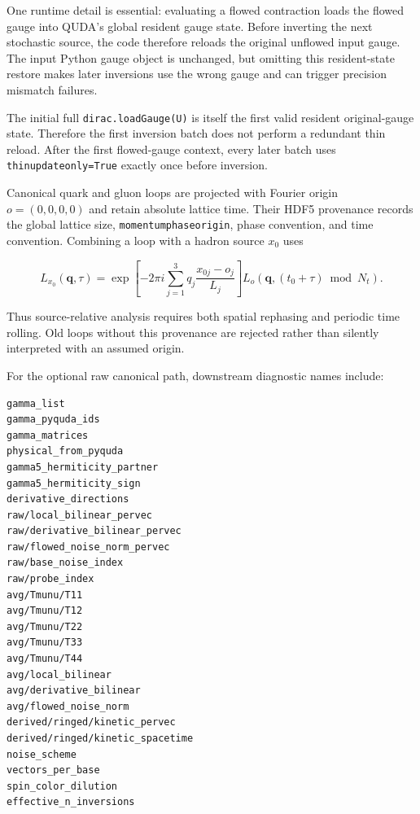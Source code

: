 \documentclass[11pt,a4paper]{article}
\newcommand{\code}[1]{\texttt{\begingroup\def\_{\textunderscore\allowbreak}#1\endgroup}}
\begin{document}
One runtime detail is essential: evaluating a flowed contraction loads the
flowed gauge into QUDA's global resident gauge state.  Before inverting the next
stochastic source, the code therefore reloads the original unflowed input gauge.
The input Python gauge object is unchanged, but omitting this resident-state
restore makes later inversions use the wrong gauge and can trigger precision
mismatch failures.

The initial full \code{dirac.loadGauge(U)} is itself the first valid resident
original-gauge state.  Therefore the first inversion batch does not perform a
redundant thin reload.  After the first flowed-gauge context, every later batch
uses \code{thin\_update\_only=True} exactly once before inversion.

Canonical quark and gluon loops are projected with Fourier origin
$o=(0,0,0,0)$ and retain absolute lattice time.  Their HDF5 provenance records
the global lattice size, \code{momentum\_phase\_origin}, phase convention, and
time convention.  Combining a loop with a hadron source $x_0$ uses

\begin{equation}
 L_{x_0}(\boldsymbol q,\tau)
 = \exp\!\left[-2\pi i\sum_{j=1}^{3}
       q_j\frac{x_{0j}-o_j}{L_j}\right]
   L_o\!\left(\boldsymbol q,(t_0+\tau)\bmod N_t\right).
\end{equation}

Thus source-relative analysis requires both spatial rephasing and periodic
time rolling.  Old loops without this provenance are rejected rather than
silently interpreted with an assumed origin.

For the optional raw canonical path, downstream diagnostic names include:
\begin{verbatim}
gamma_list
gamma_pyquda_ids
gamma_matrices
physical_from_pyquda
gamma5_hermiticity_partner
gamma5_hermiticity_sign
derivative_directions
raw/local_bilinear_pervec
raw/derivative_bilinear_pervec
raw/flowed_noise_norm_pervec
raw/base_noise_index
raw/probe_index
avg/Tmunu/T11
avg/Tmunu/T12
avg/Tmunu/T22
avg/Tmunu/T33
avg/Tmunu/T44
avg/local_bilinear
avg/derivative_bilinear
avg/flowed_noise_norm
derived/ringed/kinetic_pervec
derived/ringed/kinetic_spacetime
noise_scheme
vectors_per_base
spin_color_dilution
effective_n_inversions
\end{verbatim}
\end{document}
